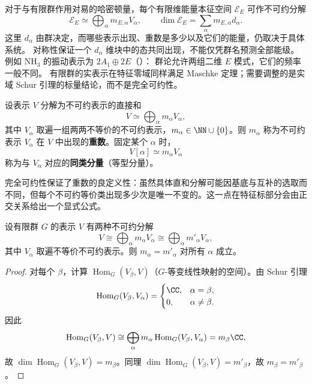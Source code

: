 对于与有限群作用对易的哈密顿量，每个有限维能量本征空间 $\mathcal E_E$ 可作不可约分解
\[
\mathcal E_E\simeq\bigoplus_\alpha m_{E,\alpha}V_\alpha,
\qquad \dim\mathcal E_E=\sum_\alpha m_{E,\alpha}d_\alpha.
\]
这里 $d_\alpha$ 由群决定，而哪些表示出现、重数是多少以及它们的能量，仍取决于具体系统。
对称性保证一个 $d_\alpha$ 维块中的态共同出现，不能仅凭群名预测全部能级。
例如 $\mathrm{NH_3}$ 的振动表示为 $2A_1\oplus2E$（）：
群论允许两组二维 $E$ 模式，它们的频率一般不同。
有限群的实表示在特征零域同样满足 Maschke 定理；需要调整的是实域 Schur 引理的标量结论，而不是完全可约性。

\begin{definition}[重数与同类分量]
设表示 $V$ 分解为不可约表示的直接和
\[
V\simeq \bigoplus_{\alpha} m_\alpha V_\alpha,
\]
其中 $V_\alpha$ 取遍一组两两不等价的不可约表示，$m_\alpha\in\NN\cup\{0\}$。则 $m_\alpha$ 称为不可约表示 $V_\alpha$ 在 $V$ 中出现的\textbf{重数}。固定某个 $\alpha$ 时，
\[
V[\alpha]\simeq m_\alpha V_\alpha
\]
称为与 $V_\alpha$ 对应的\textbf{同类分量}（等型分量）。
\label{def:multiplicity-isotypic}
\end{definition}

完全可约性保证了重数的良定义性：虽然具体直和分解可能因基底与互补的选取而不同，但每个不可约等价类出现多少次是唯一不变的。这一点在特征标部分会由正交关系给出一个显式公式。

\begin{theorem}
\label{thm:decomposition-uniqueness}
设有限群 $G$ 的表示 $V$ 有两种不可约分解
\[
V\cong\bigoplus_\alpha m_\alpha V_\alpha
\cong\bigoplus_\alpha m'_\alpha V_\alpha,
\]
其中 $V_\alpha$ 取遍不等价不可约表示。则 $m_\alpha=m'_\alpha$ 对所有 $\alpha$ 成立。

\end{theorem}

\begin{proof}
对每个 $\beta$，计算 $\operatorname{Hom}_G(V_\beta,V)$（$G$-等变线性映射的空间）。由 Schur 引理
\[
\operatorname{Hom}_G(V_\beta,V_\alpha)=\begin{cases}\CC,&\alpha=\beta,\\0,&\alpha\neq\beta.\end{cases}
\]
因此
\[
\operatorname{Hom}_G(V_\beta,V)\cong\bigoplus_\alpha m_\alpha\operatorname{Hom}_G(V_\beta,V_\alpha)=m_\beta\CC,
\]
故 $\dim\operatorname{Hom}_G(V_\beta,V)=m_\beta$。同理 $\dim\operatorname{Hom}_G(V_\beta,V)=m'_\beta$，故 $m_\beta=m'_\beta$。
\end{proof}

